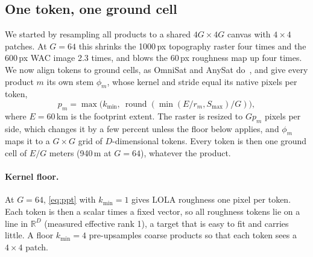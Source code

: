 \subsection{One token, one ground cell}
\label{sec:tokens}

We started by resampling all products to a shared $4G\times4G$ canvas with $4\times4$ patches. At $G{=}64$ this shrinks the 1000\,px topography raster four times and the 600\,px WAC image 2.3 times, and blows the 60\,px roughness map up four times. We now align tokens to ground cells, as OmniSat and AnySat do~\cite{astruc2024omnisat,astruc2025anysat}, and give every product $m$ its own stem $\phi_m$, whose kernel and stride equal its native pixels per token,
\begin{equation}
  p_m = \max\!\big(k_{\min},\ \operatorname{round}(\min(E/r_m, S_{\max})/G)\big),
  \label{eq:ppt}
\end{equation}
where $E{=}60$\,km is the footprint extent. The raster is resized to $Gp_m$ pixels per side, which changes it by a few percent unless the floor below applies, and $\phi_m$ maps it to a $G\times G$ grid of $D$-dimensional tokens. Every token is then one ground cell of $E/G$ meters (940\,m at $G{=}64$), whatever the product.

\paragraph{Kernel floor.} At $G{=}64$, \cref{eq:ppt} with $k_{\min}{=}1$ gives LOLA roughness one pixel per token. Each token is then a scalar times a fixed vector, so all roughness tokens lie on a line in $\mathbb{R}^D$ (measured effective rank 1), a target that is easy to fit and carries little. A floor $k_{\min}{=}4$ pre-upsamples coarse products so that each token sees a $4\times4$ patch.

